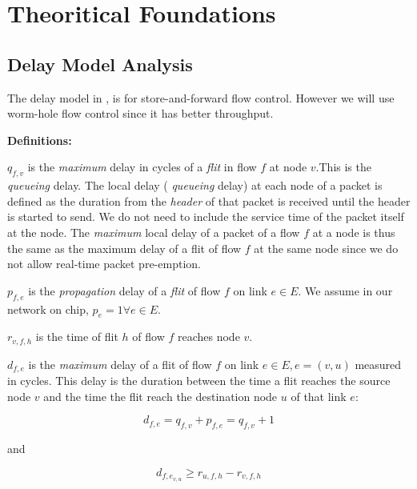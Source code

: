 \documentclass[conference, twocolumn]{IEEEtran}
\theoremstyle{definition}
\begin{document}
\section{Theoritical Foundations}
\subsection{Delay Model Analysis}

The delay model in \cite{Ferrari90ascheme}, \cite{VermaJitter91} is
for store-and-forward flow control. However we will use worm-hole flow
control since it has better throughput.

{\textbf{Definitions:}}

$q_{f,v}$ is the {\em maximum} delay in cycles of a {\em flit} in
flow $f$ at node $v$.This is the {\em queueing} delay. The local delay ({\em
queueing} delay) at each node of a packet is defined as the duration from the
{\em header} of that  packet is received until the header is started to send.
We do not need to include the service time of the packet itself at the node.
The {\em maximum} local delay of a packet of a flow $f$ at a node is thus the
same as the maximum delay of a flit of flow $f$ at the same node since we do
not allow real-time packet pre-emption. %


 
$p_{f,e}$ is the {\em propagation} delay of a {\em flit} of flow $f$ on link $e
\in E$. We assume in our network on chip, $p_e=1 \forall e \in E$.

$r_{v,f,h}$ is the time of flit $h$ of flow $f$ reaches node $v$.  

$d_{f,e}$ is the {\em maximum} delay of a flit of flow $f$ on link $e \in E,
e=(v,u)$ measured in cycles. This delay is the duration between the time a flit
reaches the source node $v$ and the time the flit reach the destination node
$u$ of that link $e$:

\begin{equation}\label{equ:edgeDelay}
d_{f,e} = q_{f,v} + p_{f,e} = q_{f,v} + 1 
\end{equation}

and

\begin{equation} 
d_{f,e_{v,u}} \geq r_{u,f,h} - r_{v,f,h}
\end{equation}
\end{document}
